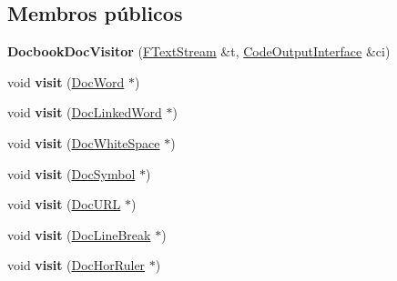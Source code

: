 \subsection*{Membros públicos}
\begin{DoxyCompactItemize}
\item 
\hypertarget{class_docbook_doc_visitor_a93a95f57640466e390161b3423bc4fa8}{{\bfseries Docbook\-Doc\-Visitor} (\hyperlink{class_f_text_stream}{F\-Text\-Stream} \&t, \hyperlink{class_code_output_interface}{Code\-Output\-Interface} \&ci)}\label{class_docbook_doc_visitor_a93a95f57640466e390161b3423bc4fa8}

\item 
\hypertarget{class_docbook_doc_visitor_ac60f6c2f041b955124e3ba6b63111ca5}{void {\bfseries visit} (\hyperlink{class_doc_word}{Doc\-Word} $\ast$)}\label{class_docbook_doc_visitor_ac60f6c2f041b955124e3ba6b63111ca5}

\item 
\hypertarget{class_docbook_doc_visitor_ab957281f81eaa9db582ac66f014ef342}{void {\bfseries visit} (\hyperlink{class_doc_linked_word}{Doc\-Linked\-Word} $\ast$)}\label{class_docbook_doc_visitor_ab957281f81eaa9db582ac66f014ef342}

\item 
\hypertarget{class_docbook_doc_visitor_a8e427da6441fcfec76f860101da1b132}{void {\bfseries visit} (\hyperlink{class_doc_white_space}{Doc\-White\-Space} $\ast$)}\label{class_docbook_doc_visitor_a8e427da6441fcfec76f860101da1b132}

\item 
\hypertarget{class_docbook_doc_visitor_aba7904fef0b15b1ff249f41815d3b739}{void {\bfseries visit} (\hyperlink{class_doc_symbol}{Doc\-Symbol} $\ast$)}\label{class_docbook_doc_visitor_aba7904fef0b15b1ff249f41815d3b739}

\item 
\hypertarget{class_docbook_doc_visitor_a38b6defe4c1e4aa2fb6bbc944f58f93c}{void {\bfseries visit} (\hyperlink{class_doc_u_r_l}{Doc\-U\-R\-L} $\ast$)}\label{class_docbook_doc_visitor_a38b6defe4c1e4aa2fb6bbc944f58f93c}

\item 
\hypertarget{class_docbook_doc_visitor_a1719b7dfc3a83b7976ff5997f56cd474}{void {\bfseries visit} (\hyperlink{class_doc_line_break}{Doc\-Line\-Break} $\ast$)}\label{class_docbook_doc_visitor_a1719b7dfc3a83b7976ff5997f56cd474}

\item 
\hypertarget{class_docbook_doc_visitor_aeed3d42f5e96c4016fbc6ab678f5549a}{void {\bfseries visit} (\hyperlink{class_doc_hor_ruler}{Doc\-Hor\-Ruler} $\ast$)}\label{class_docbook_doc_visitor_aeed3d42f5e96c4016fbc6ab678f5549a}


\end{DoxyCompactItemize}
